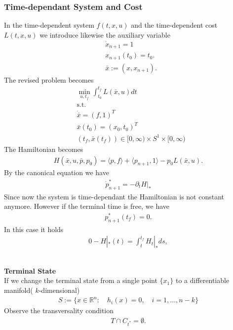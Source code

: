 \documentclass[a4paper,11pt,fleqn]{book}
\theoremstyle{definition}
\theoremstyle{remark}
\begin{document}
\subsubsection{Time-dependant System and Cost}
In the time-dependent system $f(t, x, u)$ and the time-dependent cost $L(t, x, u)$ we introduce likewise the auxiliary variable
\begin{align*}
	& \dot{x}_{n +1} = 1\\
	& x_{n + 1}(t_0) = t_0.\\
	& \bar{x}:= (x, x_{n + 1}). 
\end{align*}
The revised problem becomes
\begin{align*}
	&\min_{u, t_f} \int_{t_0}^{t_f} L(\bar{x}, u)dt \\
	& \text{s.t.}\\
	& \dot{\bar{x}} = (f, 1)^T\\
	& \bar{x}(t_0) = (x_0, t_0)^T\\
	& (t_f, \bar{x}(t_f)) \in [0, \infty) \times S^1 \times [0, \infty)
\end{align*}
The Hamiltonian becomes
\begin{align*}
	H(\bar{x}, u, \bar{p}, p_0) = \langle p, f \rangle + \langle p_{n + 1}, 1 \rangle - p_0 L(\bar{x}, u). 
\end{align*}
By the canonical equation we have
\begin{align*}
	\dot{p}_{n +1}^* = - \partial_t H|_*
\end{align*}
Since now the system is time-dependant the Hamiltonian is not constant anymore. However if the terminal time is free, we have
\begin{align*}
	p^*_{n + 1}(t_f) = 0.
\end{align*}
In this case it holds
\begin{align*}
	0 - H|_*(t) = \int_t^{t_f} H_t|_* ds, 
\end{align*}



\quad\\
\textbf{Terminal State}\quad\\
If we change the terminal state from a single point $\{x_1\}$ to a differentiable manifold( $k$-dimensional)
\begin{align*}
	S:= \{x \in \mathbb{R}^n: \quad h_i(x) = 0, \quad i= 1, \dots, n - k\}
\end{align*}
Observe the transversality condition
\begin{align*}
	T \cap C_{t^*} = \emptyset. 
\end{align*} 
\end{document}
